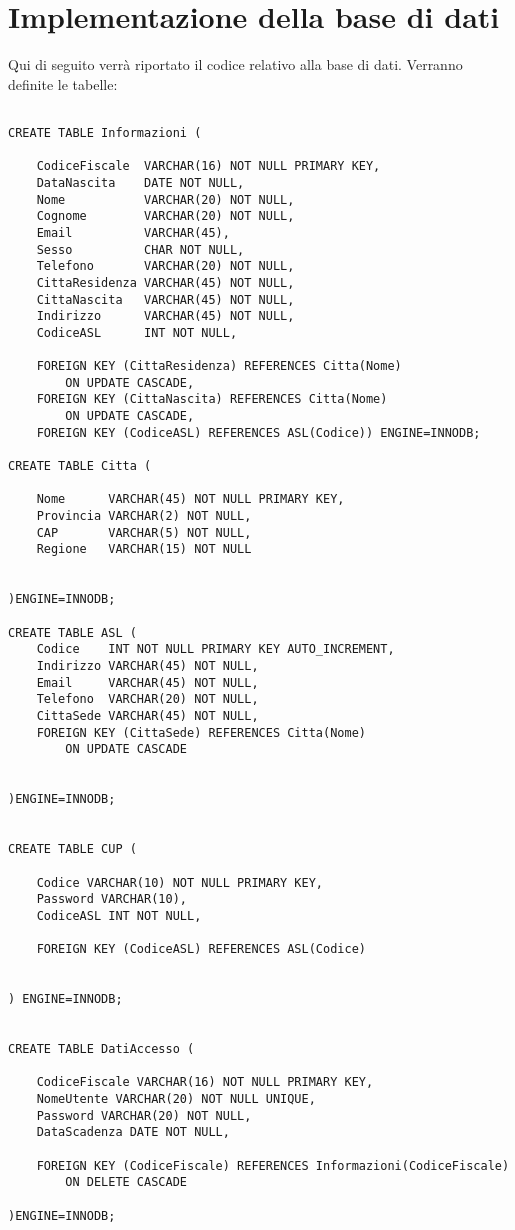 \documentclass{report}
\begin{document}
\section*{Implementazione della base di dati}
Qui di seguito verrà riportato il codice relativo alla base di dati. Verranno definite le tabelle: 
 \begin{verbatim}
  
CREATE TABLE Informazioni (

	CodiceFiscale  VARCHAR(16) NOT NULL PRIMARY KEY,
	DataNascita    DATE NOT NULL,
	Nome 		   VARCHAR(20) NOT NULL,
	Cognome		   VARCHAR(20) NOT NULL,
	Email		   VARCHAR(45),
	Sesso		   CHAR NOT NULL,
	Telefono	   VARCHAR(20) NOT NULL,
	CittaResidenza VARCHAR(45) NOT NULL,
	CittaNascita   VARCHAR(45) NOT NULL,
	Indirizzo	   VARCHAR(45) NOT NULL,
	CodiceASL 	   INT NOT NULL,

	FOREIGN KEY (CittaResidenza) REFERENCES Citta(Nome) 
		ON UPDATE CASCADE,
	FOREIGN KEY (CittaNascita) REFERENCES Citta(Nome) 
		ON UPDATE CASCADE,
	FOREIGN KEY (CodiceASL) REFERENCES ASL(Codice)) ENGINE=INNODB;

CREATE TABLE Citta (

	Nome 	  VARCHAR(45) NOT NULL PRIMARY KEY,
	Provincia VARCHAR(2) NOT NULL,
	CAP		  VARCHAR(5) NOT NULL,
	Regione   VARCHAR(15) NOT NULL


)ENGINE=INNODB;

CREATE TABLE ASL (
	Codice    INT NOT NULL PRIMARY KEY AUTO_INCREMENT,
	Indirizzo VARCHAR(45) NOT NULL,
	Email     VARCHAR(45) NOT NULL,
	Telefono  VARCHAR(20) NOT NULL,
	CittaSede VARCHAR(45) NOT NULL,
	FOREIGN KEY (CittaSede) REFERENCES Citta(Nome)
		ON UPDATE CASCADE


)ENGINE=INNODB; 


CREATE TABLE CUP (

	Codice VARCHAR(10) NOT NULL PRIMARY KEY,
	Password VARCHAR(10),
	CodiceASL INT NOT NULL,

	FOREIGN KEY (CodiceASL) REFERENCES ASL(Codice) 


) ENGINE=INNODB;


CREATE TABLE DatiAccesso (

	CodiceFiscale VARCHAR(16) NOT NULL PRIMARY KEY,
	NomeUtente VARCHAR(20) NOT NULL UNIQUE,
	Password VARCHAR(20) NOT NULL,
	DataScadenza DATE NOT NULL,
	
	FOREIGN KEY (CodiceFiscale) REFERENCES Informazioni(CodiceFiscale)
		ON DELETE CASCADE

)ENGINE=INNODB;



\end{verbatim}
\end{document}
